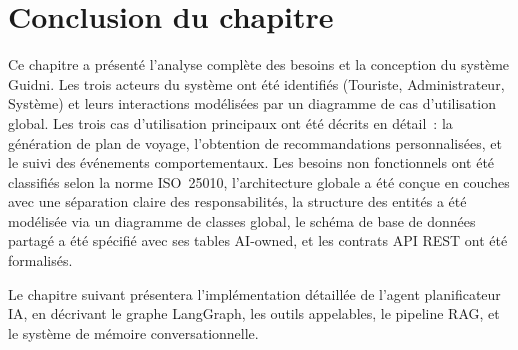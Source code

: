 \section*{Conclusion du chapitre}

Ce chapitre a présenté l'analyse complète des besoins et la conception du système Guidni. Les
trois acteurs du système ont été identifiés (Touriste, Administrateur, Système) et leurs
interactions modélisées par un diagramme de cas d'utilisation global. Les trois cas d'utilisation
principaux ont été décrits en détail~: la génération de plan de voyage, l'obtention de
recommandations personnalisées, et le suivi des événements comportementaux. Les besoins non
fonctionnels ont été classifiés selon la norme ISO~25010, l'architecture globale a été conçue
en couches avec une séparation claire des responsabilités, la structure des entités a été 
modélisée via un diagramme de classes global, le schéma de base de données partagé
a été spécifié avec ses tables AI-owned, et les contrats API REST ont été formalisés.

Le chapitre suivant présentera l'implémentation détaillée de l'agent planificateur IA, en
décrivant le graphe LangGraph, les outils appelables, le pipeline RAG, et le système de
mémoire conversationnelle.
